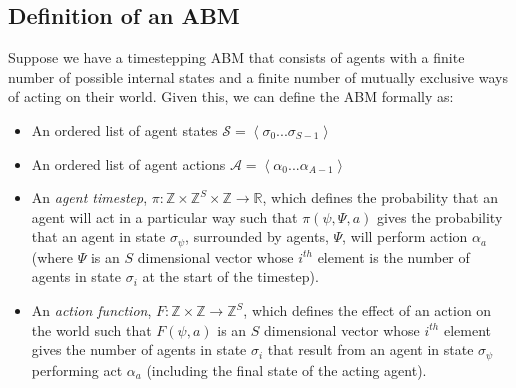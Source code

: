 \documentclass{article}
\begin{document}
\subsection{Definition of an ABM}
\label{abmdef}
Suppose we have a timestepping ABM that consists of agents with a finite number of possible internal states and a finite number of mutually exclusive ways of acting on their world. Given this, we can define the ABM formally as:
\begin{itemize}
	\item An ordered list of agent states $\mathcal{S} = \left<\sigma_0 ... \sigma_{S-1}\right>$

	\item An ordered list of agent actions $\mathcal{A} =\left< \alpha_0 ... \alpha_{A-1} \right>$	
	
	\item An \textit{agent timestep}, $\pi : \mathbb{Z}\times\mathbb{Z}^S\times\mathbb{Z} \to \mathbb{R}$, which defines the probability that an agent will act in a particular way such that $\pi(\psi,\Psi,a)$ gives the probability that an agent in state $\sigma_\psi$, surrounded by agents, $\Psi$, will perform action $\alpha_a$ (where $\Psi$ is an $S$ dimensional vector whose $i^{th}$ element is the number of agents in state $\sigma_i$ at the start of the timestep).
	
	\item An \textit{action function}, $F: \mathbb{Z} \times \mathbb{Z} \to \mathbb{Z}^S$, which defines the effect of an action on the world such that $F(\psi, a)$ is an $S$ dimensional vector whose $i^{th}$ element gives the number of agents in state $\sigma_i$ that result from an agent in state $\sigma_\psi$ performing act $\alpha_a$ (including the final state of the acting agent).
\end{itemize}
\end{document}
